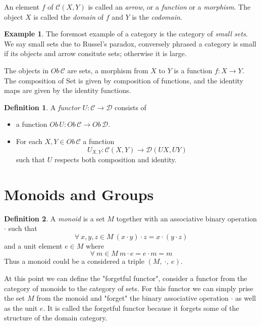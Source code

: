 \documentclass{article}
\theoremstyle{definition}
\newtheorem{definition}{Definition}[section]
\newtheorem{example}{Example}[section]
\begin{document}
\par
An element $f$ of $\mathcal{C}(X,Y)$ is called an \textit{arrow}, or a \textit{function}
or a \textit{morphism}. The object $X$ is called the \textit{domain} of $f$ and $Y$ is
the \textit{codomain}.

\begin{example}
	The foremost example of a category is the category of \textit{small sets}.
	We say small sets due to Russel's paradox, conversely phrased a category is small
	if its objects and arrow consitute sets; otherwise it is large.

	The objects in $Ob\,\mathcal{C}$ are sets,
	a morphism from $X$ to $Y$ is a function $f : X \rightarrow Y$.
	The composition of Set is given by composition of functions,
	and the identity maps are given by the identity functions.
\end{example}





\begin{definition}
	A \textit{functor} $U : \mathcal{C} \rightarrow \mathcal{D}$ consists of
	\begin{itemize}
		\item a function $Ob\,U : Ob\,\mathcal{C} \rightarrow Ob\,\mathcal{D}$.
		\item For each $X, Y \in Ob\,\mathcal{C}$ a function
			$$U_{X,Y} : \mathcal{C}(X,Y) \rightarrow \mathcal{D}(UX, UY)$$
			such that $U$ respects both composition and identity.
	\end{itemize}
\end{definition}




\section{Monoids and Groups}

\begin{definition}
	A \textit{monoid} is a set $M$ together with an associative binary operation $\cdot$ such that
	$$\forall\ x, y, z \in M\ (x \cdot y) \cdot z = x \cdot (y \cdot z)$$
	and a unit element $e \in M$ where
	$$\forall\ m \in M\ m \cdot e = e \cdot m = m$$
	Thus a monoid could be a considered a triple $(M,\ \cdot,\ e)$.
\end{definition}

At this point we can define the "forgetful functor", consider a functor from the
category of monoids to the category of sets. For this functor we can simply prise the
set $M$ from the monoid and "forget" the binary associative operation $\cdot$ as well as
the unit $e$. It is called the forgetful functor because it forgets some of the structure of
the domain category.
\end{document}
